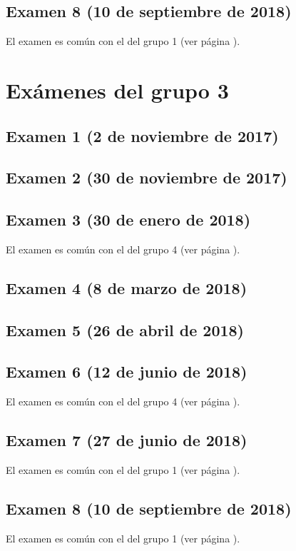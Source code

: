 \documentclass[a4paper,12pt,twoside]{book}
\begin{document}
\section{Examen 8 (10 de septiembre de 2018)}
El examen es común con el del grupo 1 (ver página \pageref{examen_17_18_1_8}).

\chapter{Exámenes del grupo 3}
\section{Examen 1 (2 de noviembre de 2017)}
\section{Examen 2 (30 de noviembre de 2017)}
\section{Examen 3 (30 de enero de 2018)}
El examen es común con el del grupo 4 (ver página \pageref{examen_17_18_4_3}).
\section{Examen 4 (8 de marzo de 2018)}
\section{Examen 5 (26 de abril de 2018)}
\section{Examen 6 (12 de junio de 2018)}
El examen es común con el del grupo 4 (ver página \pageref{examen_17_18_4_6}).
\section{Examen 7 (27 de junio de 2018)}
El examen es común con el del grupo 1 (ver página \pageref{examen_17_18_1_7}).
\section{Examen 8 (10 de septiembre de 2018)}
El examen es común con el del grupo 1 (ver página \pageref{examen_17_18_1_8}).
\end{document}
